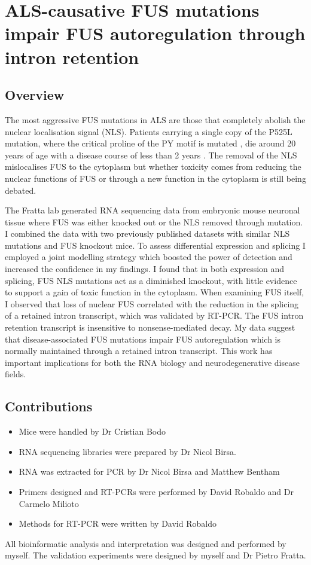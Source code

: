 \chapter{ALS-causative FUS mutations impair FUS autoregulation through intron retention}

\label{chapter:fus_meta}

\section{Overview}

The most aggressive FUS mutations in ALS are those that completely abolish the nuclear localisation signal (NLS). 
Patients carrying a single copy of the P525L mutation, where the critical proline of the PY motif is mutated \citep{Chio2009}, die around 20 years of age with a disease course of less than 2 years \citep{Shang2016}.
The removal of the NLS mislocalises FUS to the cytoplasm but whether toxicity comes from reducing the nuclear functions of FUS or through a new function in the cytoplasm is still being debated.

The Fratta lab generated RNA sequencing data from embryonic mouse neuronal tissue where FUS was either knocked out or the NLS removed through mutation. I combined the data with two previously published datasets with similar NLS mutations and FUS knockout mice. 
To assess differential expression and splicing I employed a joint modelling strategy which boosted the power of detection and increased the confidence in my findings. 
I found that in both expression and splicing, FUS NLS mutations act as a diminished knockout, with little evidence to support a gain of toxic function in the cytoplasm. 
When examining FUS itself, I observed that loss of nuclear FUS correlated with the reduction in the splicing of a retained intron transcript, which was validated by RT-PCR. 
The FUS intron retention transcript is insensitive to nonsense-mediated decay.
My data suggest that disease-associated FUS mutations impair FUS autoregulation which is normally maintained through a retained intron transcript. This work has important implications for both the RNA biology and neurodegenerative disease fields.



\section{Contributions}
\begin{itemize}
	\item Mice were handled by Dr Cristian Bodo
	\item RNA sequencing libraries were prepared by Dr Nicol Birsa.
	\item RNA was extracted for PCR by Dr Nicol Birsa and Matthew Bentham
	\item Primers designed and RT-PCRs were performed by David Robaldo and Dr Carmelo Milioto
	\item Methods for RT-PCR were written by David Robaldo
\end{itemize}
All bioinformatic analysis and interpretation was designed and performed by myself.  
The validation experiments were designed by myself and Dr Pietro Fratta.

